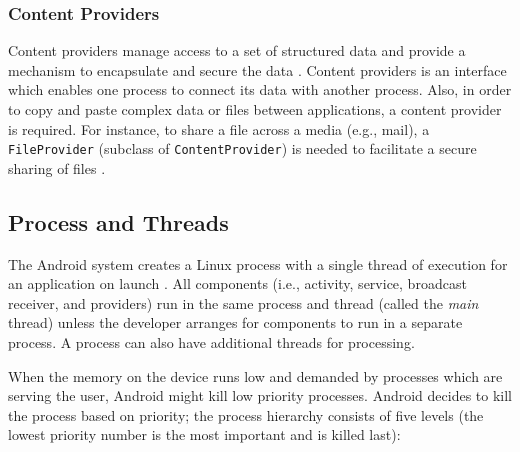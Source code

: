 \subsubsection{Content Providers}
Content providers manage access to a set of structured data and provide a mechanism to encapsulate and secure the data \cite{contentproviders}. Content providers is an interface which enables one process to connect its data with another process. Also, in order to copy and paste complex data or files between applications, a content provider is required. For instance, to share a file across a media (e.g., mail), a \verb|FileProvider| (subclass of \verb|ContentProvider|) is needed to facilitate a secure sharing of files \cite{fileprovider}.


\subsection{Process and Threads}
The Android system creates a Linux process with a single thread of execution for an application on launch \cite{proccessandthread}. All components (i.e., activity, service, broadcast receiver, and providers) run in the same process and thread (called the \textit{main} thread) unless the developer arranges for components to run in a separate process. A process can also have additional threads for processing. 

When the memory on the device runs low and demanded by processes which are serving the user, Android might kill low priority processes. Android decides to kill the process based on priority; the process hierarchy consists of five levels (the lowest priority number is the most important and is killed last):  

